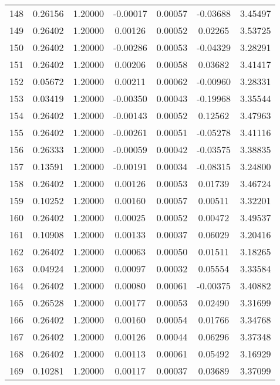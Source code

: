 \begin{longtable}{c c c c c c c}
148 &  0.26156 &      1.20000 & -0.00017 &   0.00057 &  -0.03688 &   3.45497 \\
149 &  0.26402 &      1.20000 &  0.00126 &   0.00052 &   0.02265 &   3.53725 \\
150 &  0.26402 &      1.20000 & -0.00286 &   0.00053 &  -0.04329 &   3.28291 \\
151 &  0.26402 &      1.20000 &  0.00206 &   0.00058 &   0.03682 &   3.41417 \\
152 &  0.05672 &      1.20000 &  0.00211 &   0.00062 &  -0.00960 &   3.28331 \\
153 &  0.03419 &      1.20000 & -0.00350 &   0.00043 &  -0.19968 &   3.35544 \\
154 &  0.26402 &      1.20000 & -0.00143 &   0.00052 &   0.12562 &   3.47963 \\
155 &  0.26402 &      1.20000 & -0.00261 &   0.00051 &  -0.05278 &   3.41116 \\
156 &  0.26333 &      1.20000 & -0.00059 &   0.00042 &  -0.03575 &   3.38835 \\
157 &  0.13591 &      1.20000 & -0.00191 &   0.00034 &  -0.08315 &   3.24800 \\
158 &  0.26402 &      1.20000 &  0.00126 &   0.00053 &   0.01739 &   3.46724 \\
159 &  0.10252 &      1.20000 &  0.00160 &   0.00057 &   0.00511 &   3.32201 \\
160 &  0.26402 &      1.20000 &  0.00025 &   0.00052 &   0.00472 &   3.49537 \\
161 &  0.10908 &      1.20000 &  0.00133 &   0.00037 &   0.06029 &   3.20416 \\
162 &  0.26402 &      1.20000 &  0.00063 &   0.00050 &   0.01511 &   3.18265 \\
163 &  0.04924 &      1.20000 &  0.00097 &   0.00032 &   0.05554 &   3.33584 \\
164 &  0.26402 &      1.20000 &  0.00080 &   0.00061 &  -0.00375 &   3.40882 \\
165 &  0.26528 &      1.20000 &  0.00177 &   0.00053 &   0.02490 &   3.31699 \\
166 &  0.26402 &      1.20000 &  0.00160 &   0.00054 &   0.01766 &   3.34768 \\
167 &  0.26402 &      1.20000 &  0.00126 &   0.00044 &   0.06296 &   3.37348 \\
168 &  0.26402 &      1.20000 &  0.00113 &   0.00061 &   0.05492 &   3.16929 \\
169 &  0.10281 &      1.20000 &  0.00117 &   0.00037 &   0.03689 &   3.37099 \\

\end{longtable}
